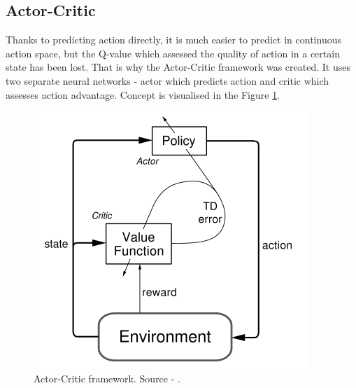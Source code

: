 \subsection{Actor-Critic}
Thanks to predicting action directly, it is much easier to predict in continuous action space, but the Q-value which assessed the quality of action in a certain state has been lost. That is why the Actor-Critic framework was created. It uses two separate neural networks - actor which predicts action and critic which assesses action advantage. Concept is visualised in the Figure \ref{fig:actorcritic}.
\begin{figure}[H]
\centering
\includegraphics[scale=0.55]{fig/actor-critic.png}
\caption[Actor-Critic framework]{Actor-Critic framework. Source - \cite{sutton2012}.}
\label{fig:actorcritic}
\end{figure}
\clearpage

